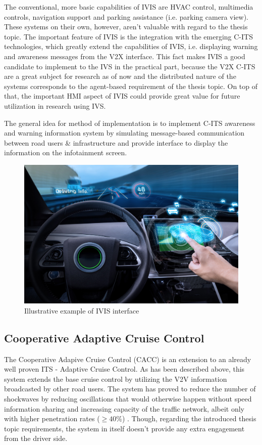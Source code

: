 \documentclass[main.tex]{subfiles}
\begin{document}
The conventional, more basic capabilities of IVIS are HVAC control, multimedia controls, navigation support and 
parking assistance (i.e. parking camera view). These systems on their own, however, aren't valuable with regard 
to the thesis topic. The important feature of IVIS is the integration with the emerging C-ITS technologies, which 
greatly extend the capabilities of IVIS, i.e. displaying warning and awareness messages from the V2X interface. 
This fact makes IVIS a good candidate to implement to the IVS in the practical part, because the V2X C-ITS are 
a great subject for research as of now and the distributed nature of the systems corresponds to the agent-based 
requirement of the thesis topic. On top of that, the important HMI aspect of IVIS could provide great value for 
future utilization in research using IVS. 

The general idea for method of implementation is to implement C-ITS awareness and warning information system by 
simulating message-based communication between road users \& infrastructure and provide interface to display the 
information on the infotainment screen.

\begin{figure}[htbp]
    \centering
    \includegraphics[width=.8\textwidth]{ivis-dashboard.jpg}
    \caption{Illustrative example of IVIS interface \cite{Saxena}}
    \label{ivis-interface}
\end{figure}

\subsection{Cooperative Adaptive Cruise Control}

The Cooperative Adapive Cruise Control (CACC) is an extension to an already well proven ITS - Adaptive Cruise Control.
As has been described above, this system extends the base cruise control by utilizing the V2V information broadcasted 
by other road users. The system has proved to reduce the number of shockwaves by reducing
oscillations that would otherwise happen without speed information sharing and increasing
capacity of the traffic network, albeit only with higher penetration rates ($\ge 40\%$)
\cite{van_Arem_2006}. Though, regarding the introduced thesis topic requirements, 
the system in itself doesn't provide any extra engagement from the driver side. 
\end{document}
